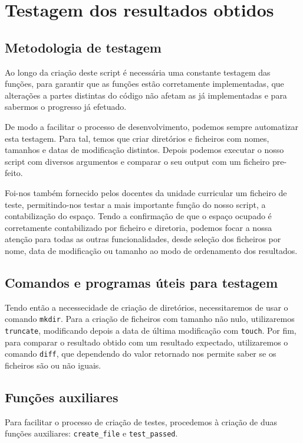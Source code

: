 \chapter{Testagem dos resultados obtidos}
\section{Metodologia de testagem}
Ao longo da criação deste script é necessária uma constante
testagem das funções, para garantir que as funções estão
corretamente implementadas, que alterações a partes
distintas do código não afetam as já implementadas e para
sabermos o progresso já efetuado.

De modo a facilitar o processo de desenvolvimento, podemos
sempre automatizar esta testagem. Para tal, temos que criar diretórios e ficheiros com nomes,
tamanhos e datas de modificação distintos. Depois podemos
executar o nosso script com diversos argumentos e comparar o
seu output com um ficheiro pre-feito.

Foi-nos também fornecido pelos docentes da unidade
curricular um ficheiro de teste, permitindo-nos testar a
mais importante função do nosso script, a contabilização do
espaço. Tendo a confirmação de que o espaço ocupado é
corretamente contabilizado por ficheiro e diretoria, podemos
focar a nossa atenção para todas as outras funcionalidades,
desde seleção dos ficheiros por nome, data de modificação ou
tamanho ao modo de ordenamento dos resultados.

\section{Comandos e programas úteis para testagem}
Tendo então a necessecidade de criação de diretórios,
necessitaremos de usar o comando \verb|mkdir|. Para a
criação de ficheiros com tamanho não nulo,
utilizaremos \verb|truncate|, modificando depois a data de
última modificação com \verb|touch|. Por fim, para comparar
o resultado obtido com um resultado expectado, utilizaremos
o comando \verb|diff|, que dependendo do valor retornado nos
permite saber se os ficheiros são ou não iguais.

\section{Funções auxiliares}

Para facilitar o processo de criação de testes, procedemos à criação de duas funções auxiliares: \verb|create_file| e
\verb|test_passed|.

